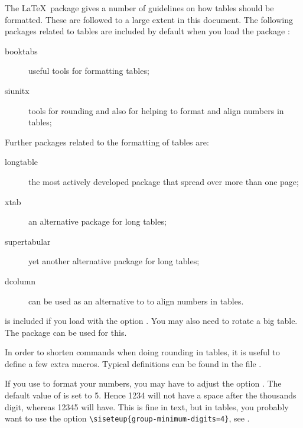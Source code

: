 \documentclass[UKenglish, texlive=2016]{atlasdoc}
\begin{document}
The \LaTeX\ package  gives a number of guidelines on how tables should be formatted.
These are followed to a large extent in this document.
The following packages related to tables are included by default when you load the package :
\begin{description}
\item[booktabs] useful tools for formatting tables;
\item[siunitx] tools for rounding and also for helping to format and align numbers in tables;
\end{description}
Further packages related to the formatting of tables are:
\begin{description}
\item[longtable] the most actively developed package that spread over more than one page;
\item[xtab] an alternative package for long tables;
\item[supertabular] yet another alternative package for long tables;
\item[dcolumn] can be used as an alternative to  to align numbers in tables.
\end{description}
 is included if you load  with the option .
You may also need to rotate a big table.
The  package can be used for this.

In order to shorten commands when doing rounding in tables, it is useful to define a few extra macros.
Typical definitions can be found in the file .

If you use  to format your numbers,
you may have to adjust the option .
 The default value of  is set to 5.
Hence \num{1234} will not have a space after the thousands digit,
whereas \num{12345} will have.
This is fine in text, but in tables, you probably want to use the option
\verb|\siseteup{group-minimum-digits=4}|,
see .
\end{document}
